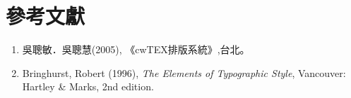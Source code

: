 \chapter{參考文獻}
\renewcommand{\labelenumi}{[\arabic{enumi}]}
\begin{enumerate}
    \item 吳聰敏．吳聰慧(2005), 《cwTEX排版系統》,台北。
    \item Bringhurst, Robert (1996), {\it The Elements of Typographic Style}, Vancouver: Hartley \& Marks, 2nd edition.
\end{enumerate}